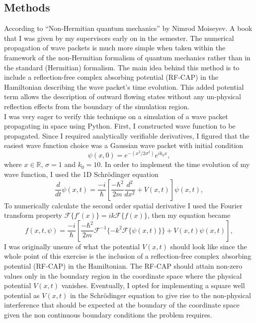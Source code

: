 \documentclass[10pt, a4paper, singlespacing, headsepline]{article}
\begin{document}
\subsection{Methods}
According to ``Non-Hermitian quantum mechanics'' by Nimrod Moiseyev. A book that I was given by my supervisors early on in the semester. The numerical propagation of wave packets is much more simple when taken within the framework of the non-Hermitian formalism of quantum mechanics rather than in the standard (Hermitian) formalism\cite{Moiseyev}. The main idea behind this method is to include a reflection-free complex absorbing potential (RF-CAP) in the Hamiltonian describing the wave packet's time evolution. This added potential term allows the description of outward flowing states without any un-physical reflection effects from the boundary of the simulation region.\\
I was very eager to verify this technique on a simulation of a wave packet propagating in space using Python. First, I constructed wave function to be propagated. Since I required analytically verifiable derivatives, I figured that the easiest wave function choice was a Gaussian wave packet with initial condition 
\begin{equation} \label{eq:13}
\psi(x, 0) = e^{-(x^2/2\sigma^2)}e^{ik_{0}x},
\end{equation}
where $x \in \mathds{R}$, $\sigma = 1$ and $k_{0} = 10$. In order to implement the time evolution of my wave function, I used the 1D Schrödinger equation
 \begin{equation} \label{eq:14}
\frac{d}{dt}\psi(x, t) = \frac{-i}{\hbar} \left [ \frac{-\hbar^2}{2m} \frac{d^2}{dx^2} + V(x, t)\right ] \psi(x, t),
\end{equation}
To numerically calculate the second order spatial derivative I used the Fourier transform property \mbox{$\mathcal{F}\{f'(x)\} = ik\mathcal{F}\{f(x)\}$}, then my equation became
\begin{equation} \label{eq:15}
f(x, t, \psi) =  \frac{-i}{\hbar} \left [ \frac{-\hbar^2}{2m} \mathcal{F}^{-1}\{-k^2\mathcal{F}\{\psi(x, t)\}\} + V(x, t)\psi(x, t)\right ],
\end{equation}
I was originally unsure of what the potential $V(x,t)$ should look like since the whole point of this exercise is the inclusion of a reflection-free complex absorbing potential (RF-CAP) in the Hamiltonian. The RF-CAP should attain non-zero values only in the boundary region in the coordinate space where the physical potential $V(x,t)$ vanishes\cite{Moiseyev}. Eventually, I opted for implementing a square well potential as $V(x,t)$ in the Schrödinger equation to give rise to the non-physical interference that should be expected at the boundary of the coordinate space given the non continuous boundary conditions the problem requires.
\end{document}

